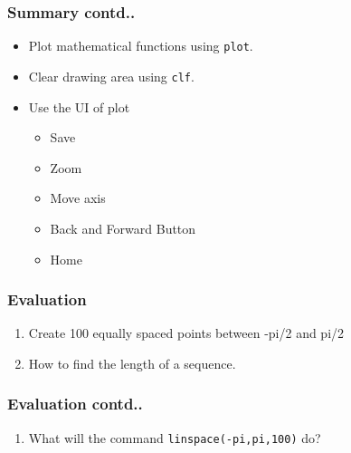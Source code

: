 \documentclass[17pt,compress]{beamer}
\newcounter{saveenumi}
\newcommand{\seti}{\setcounter{saveenumi}{\value{enumi}}}
\newcommand{\conti}{\setcounter{enumi}{\value{saveenumi}}}
\begin{document}
\begin{frame}
\frametitle{Summary contd..}
\label{sec-6.2}
\begin{itemize}
\item Plot mathematical functions using \texttt{plot}.
\item Clear drawing area using \texttt{clf}.
\item Use the UI of plot
\begin{itemize}
\item Save
\item Zoom
\item Move axis
\item Back and Forward Button
\item Home
\end{itemize}
\end{itemize}
\end{frame}
\begin{frame}
\frametitle{Evaluation}
\label{sec-7.1}
\begin{enumerate}
\item Create 100 equally spaced points between -pi/2 and pi/2\pause
\item How to find the length of a sequence.
	\seti
\end{enumerate}
\end{frame}
\begin{frame}
\frametitle{Evaluation contd..}
\label{sec-7.2}
\begin{enumerate}
	\conti
\item What will the command \texttt{linspace(-pi,pi,100)} do?\pause
\begin{itemize}
\end{itemize}
\end{enumerate}
\end{frame}
\end{document}
